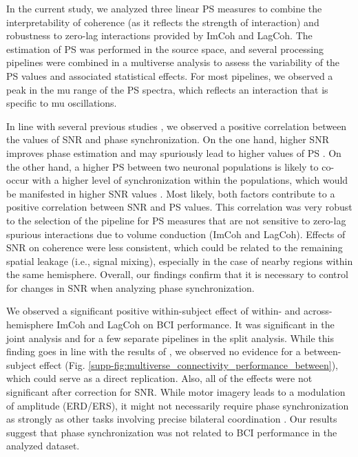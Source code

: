 \medskip

In the current study, we analyzed three linear PS measures to combine the interpretability of coherence (as it reflects the strength of interaction) and robustness to zero-lag interactions provided by ImCoh and LagCoh. The estimation of PS was performed in the source space, and several processing pipelines were combined in a multiverse analysis to assess the variability of the PS values and associated statistical effects. For most pipelines, we observed a peak in the mu range of the PS spectra, which reflects an interaction that is specific to mu oscillations.

\medskip

In line with several previous studies \citep{Bayraktaroglu2013, Vidaurre2020}, we observed a positive correlation between the values of SNR and phase synchronization. On the one hand, higher SNR improves phase estimation and may spuriously lead to higher values of PS \citep{MuthukumaraswamySingh2011}. On the other hand, a higher PS between two neuronal populations is likely to co-occur with a higher level of synchronization within the populations, which would be manifested in higher SNR values \citep{Schneider2021}. Most likely, both factors contribute to a positive correlation between SNR and PS values. This correlation was very robust to the selection of the pipeline for PS measures that are not sensitive to zero-lag spurious interactions due to volume conduction (ImCoh and LagCoh). Effects of SNR on coherence were less consistent, which could be related to the remaining spatial leakage (i.e., signal mixing), especially in the case of nearby regions within the same hemisphere. Overall, our findings confirm that it is necessary to control for changes in SNR when analyzing phase synchronization.

\medskip

We observed a significant positive within-subject effect of within- and across-hemisphere ImCoh and LagCoh on BCI performance. It was significant in the joint analysis and for a few separate pipelines in the split analysis. While this finding goes in line with the results of \citep{Vidaurre2020}, we observed no evidence for a between-subject effect (Fig. \ref{supp-fig:multiverse_connectivity_performance_between}), which could serve as a direct replication. Also, all of the effects were not significant after correction for SNR. While motor imagery leads to a modulation of amplitude (ERD/ERS), it might not necessarily require phase synchronization as strongly as other tasks involving precise bilateral coordination \citep{Shih2021}. Our results suggest that phase synchronization was not related to BCI performance in the analyzed dataset.

